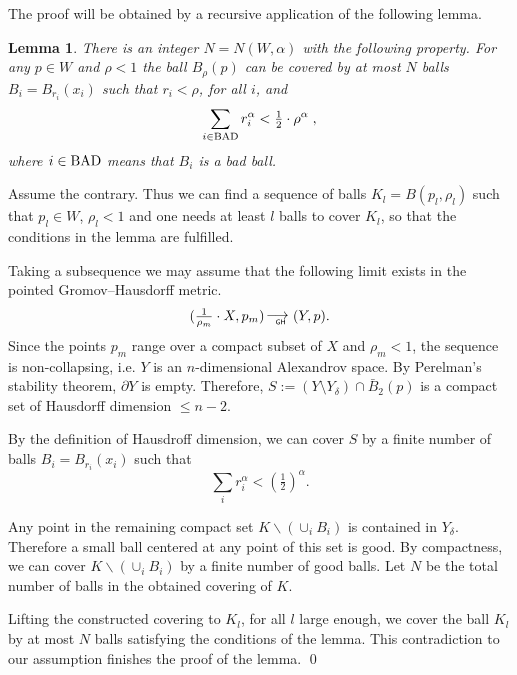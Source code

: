 \documentclass[12pt,leqno]{amsart}
\numberwithin{equation}{section}
\newtheorem{lem}[thm]{Lemma}
\theoremstyle{definition}
\theoremstyle{remark}
\def\BAD{\mathop{\rm BAD}\nolimits}%
\newcommand*{\GHto}{\mathbin{\begin{picture}(16,3.5)
\put(-1,1){$\longrightarrow$}
\put(13,-3){\llap{\text{\sf\tiny GH}}}
\end{picture}}}
\def\parit#1{\medskip\noindent{\it #1}}
\def\qeds{\qed\par\medskip}
\begin{document}
The proof will be obtained by a recursive application of the following lemma.

\begin{lem}\label{lem:covering}
There is an integer $N  =N(W,\alpha) $ with the following property. For any $p\in W$ and $\rho < 1$
the ball $B_{\rho}(p)$ can be covered by at most $N$ balls
 $B_i=B_{r_i}(x_i)$ such that $r_i <\rho$, for all $i$, and
$$ \sum_{i\in \BAD}r_i^{\alpha}< \tfrac12\cdot \rho^{\alpha} \; ,$$
where $i\in \BAD$ means that $B_i$ is a bad ball.
\end{lem}

\parit{Proof.}
Assume the contrary. Thus we can find   a sequence of  balls
$K_l=B(p_l,\rho_l)$
such that $p_l\in W$,
$\rho_l<1$ and
one needs at least $l$ balls to cover $K_l$, so that the conditions in the lemma are fulfilled.

Taking a subsequence we may assume that the following limit exists in the pointed Gromov--Hausdorff metric.
$$(\tfrac1{\rho_m}\cdot X,p_m)\GHto (Y,p).$$
Since the points $p_m$ range over a compact subset of $X$ and   $\rho _m <1$, the
sequence is non-collapsing, i.e. $Y$ is an $n$-dimensional Alexandrov space.
By Perelman's stability theorem, $\partial Y$  is empty.
Therefore,  $S:= (Y\setminus Y_{\delta} ) \cap \bar B_2 (p)$ is a compact set of   Hausdorff dimension $\le n-2$.

By the definition of Hausdroff dimension, we can cover $S$ by a finite number of balls
$B_i=B_{r_i}(x_i)$ such that
$$\sum_ir_i^{\alpha} < (\tfrac12)^{\alpha}.$$


Any point in the remaining compact set $K\backslash (\cup_i B_i)$
is contained  in $Y_{\delta}$. Therefore a small ball centered at any point of this set is good.
By compactness, we can cover $K\backslash (\cup_i B_i)$ by a finite number of good balls.
Let $N$ be the total number of balls in the obtained covering of $K$.

Lifting the constructed covering to $K_l$, for all $l$ large enough,
we cover
the ball $K_l$ by at most $N$ balls satisfying the conditions of the lemma.
This  contradiction to our assumption finishes the proof of the lemma.
\qeds
\end{document}
